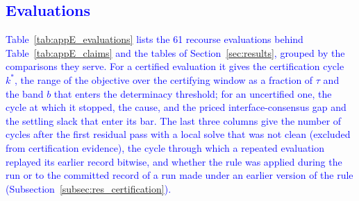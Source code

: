 {\begin{longtable}{@{}r >{\raggedright\arraybackslash}p{} c r r r c r r c@{}}
\end{longtable}}

\subsection{\textcolor{blue}{Evaluations}}
\label{app:results_evaluations}

\textcolor{blue}{
    Table~\ref{tab:appE_evaluations} lists the 61 recourse evaluations behind Table~\ref{tab:appE_claims} and the tables of Section~\ref{sec:results}, grouped by the comparisons they serve. For a certified evaluation it gives the certification cycle $k^{*}$, the range of the objective over the certifying window as a fraction of $\tau$ and the band $b$ that enters the determinacy threshold; for an uncertified one, the cycle at which it stopped, the cause, and the priced interface-consensus gap and the settling slack that enter its bar. The last three columns give the number of cycles after the first residual pass with a local solve that was not clean (excluded from certification evidence), the cycle through which a repeated evaluation replayed its earlier record bitwise, and whether the rule was applied during the run or to the committed record of a run made under an earlier version of the rule (Subsection~\ref{subsec:res_certification}).
}

